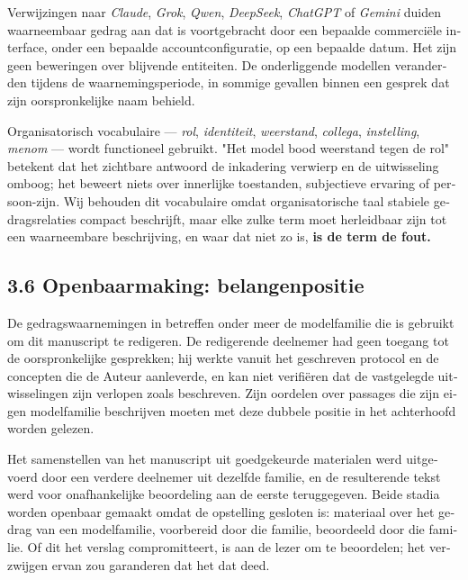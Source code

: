 \begin{dutch}
Verwijzingen naar \emph{Claude}, \emph{Grok}, \emph{Qwen}, \emph{DeepSeek}, \emph{ChatGPT} of \emph{Gemini} duiden waarneembaar gedrag aan dat is voortgebracht door een bepaalde commerciële interface, onder een bepaalde accountconfiguratie, op een bepaalde datum. Het zijn geen beweringen over blijvende entiteiten. De onderliggende modellen veranderden tijdens de waarnemingsperiode, in sommige gevallen binnen een gesprek dat zijn oorspronkelijke naam behield.

Organisatorisch vocabulaire — \emph{rol}, \emph{identiteit}, \emph{weerstand}, \emph{collega}, \emph{instelling}, \emph{menom} — wordt functioneel gebruikt. "Het model bood weerstand tegen de rol" betekent dat het zichtbare antwoord de inkadering verwierp en de uitwisseling omboog; het beweert niets over innerlijke toestanden, subjectieve ervaring of persoon-zijn. Wij behouden dit vocabulaire omdat organisatorische taal stabiele gedragsrelaties compact beschrijft, maar elke zulke term moet herleidbaar zijn tot een waarneembare beschrijving, en waar dat niet zo is, \textbf{is de term de fout.}


\subsection*{3.6 Openbaarmaking: belangenpositie}
\label{sec:nl:3.6}

De gedragswaarnemingen in  betreffen onder meer de modelfamilie die is gebruikt om dit manuscript te redigeren. De redigerende deelnemer had geen toegang tot de oorspronkelijke gesprekken; hij werkte vanuit het geschreven protocol en de concepten die de Auteur aanleverde, en kan niet verifiëren dat de vastgelegde uitwisselingen zijn verlopen zoals beschreven. Zijn oordelen over passages die zijn eigen modelfamilie beschrijven moeten met deze dubbele positie in het achterhoofd worden gelezen.

Het samenstellen van het manuscript uit goedgekeurde materialen werd uitgevoerd door een verdere deelnemer uit dezelfde familie, en de resulterende tekst werd voor onafhankelijke beoordeling aan de eerste teruggegeven. Beide stadia worden openbaar gemaakt omdat de opstelling gesloten is: materiaal over het gedrag van een modelfamilie, voorbereid door die familie, beoordeeld door die familie. Of dit het verslag compromitteert, is aan de lezer om te beoordelen; het verzwijgen ervan zou garanderen dat het dat deed.


\end{dutch}
